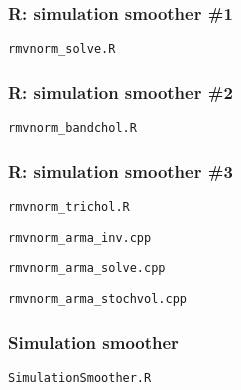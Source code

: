 \documentclass[notes,blackandwhite,mathsans]{beamer}
\begin{document}
{\begin{frame}[fragile]
\frametitle{R: simulation smoother \#1}
\texttt{rmvnorm\_solve.R}\\

\end{frame}





\begin{frame}[fragile]
\frametitle{R: simulation smoother \#2}
\texttt{rmvnorm\_bandchol.R}\\

\end{frame}



\begin{frame}[fragile]
\frametitle{R: simulation smoother \#3}
\texttt{rmvnorm\_trichol.R}\\

\end{frame}





\begin{frame}[fragile]
\texttt{rmvnorm\_arma\_inv.cpp}\\

\end{frame}



\begin{frame}[fragile]
\texttt{rmvnorm\_arma\_solve.cpp}\\

\end{frame}






\begin{frame}[fragile]
\begin{adjustwidth}{-0.6cm}{0cm}
\texttt{rmvnorm\_arma\_stochvol.cpp}\\ 

\end{adjustwidth}
\end{frame}






\begin{frame}[fragile]
\frametitle{Simulation smoother}
\texttt{SimulationSmoother.R}\\ 

\end{frame}


}
\end{document}
